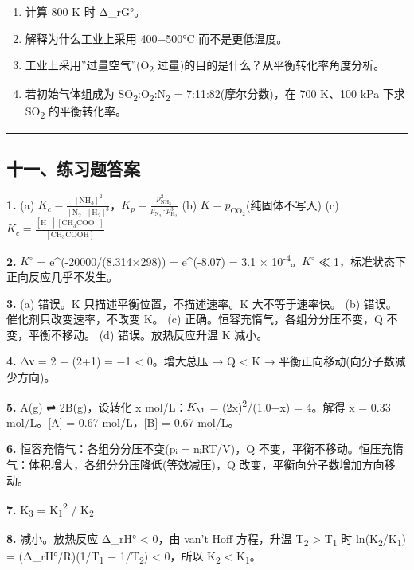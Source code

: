 \begin{enumerate}
\def\labelenumi{(\alph{enumi})}
\tightlist
\item
  计算 800 K 时 Δ\_rG°。
\item
  解释为什么工业上采用 400−500°C 而不是更低温度。
\item
  工业上采用''过量空气''(O\textsubscript{2} 过量)的目的是什么？从平衡转化率角度分析。
\item
  若初始气体组成为 SO\textsubscript{2}:O\textsubscript{2}:N\textsubscript{2} = 7:11:82(摩尔分数)，在 700 K、100 kPa 下求 SO\textsubscript{2} 的平衡转化率。
\end{enumerate}

\begin{center}\rule{0.5\linewidth}{0.5pt}\end{center}

\subsection{十一、练习题答案}\label{ux5341ux4e00ux7ec3ux4e60ux9898ux7b54ux6848}

\textbf{1.}
(a) \(K_c = \frac{[\mathrm{NH_3}]^2}{[\mathrm{N_2}][\mathrm{H_2}]^3}\)，\(K_p = \frac{p_{\mathrm{NH_3}}^2}{p_{\mathrm{N_2}} \cdot p_{\mathrm{H_2}}^3}\)
(b) \(K = p_{\mathrm{CO_2}}\)(纯固体不写入)
(c) \(K_c = \frac{[\mathrm{H^+}][\mathrm{CH_3COO^-}]}{[\mathrm{CH_3COOH}]}\)

\textbf{2.} \(K^{\circ}\) = e\^{}(-20000/(8.314×298)) = e\^{}(-8.07) = 3.1 × 10\textsuperscript{-4}。\(K^{\circ}\) ≪ 1，标准状态下正向反应几乎不发生。

\textbf{3.}
(a) 错误。K 只描述平衡位置，不描述速率。K 大不等于速率快。
(b) 错误。催化剂只改变速率，不改变 K。
(c) 正确。恒容充惰气，各组分分压不变，Q 不变，平衡不移动。
(d) 错误。放热反应升温 K 减小。

\textbf{4.} Δν = 2 − (2+1) = −1 \textless{} 0。增大总压 → Q \textless{} K → 平衡正向移动(向分子数减少方向)。

\textbf{5.} A(g) ⇌ 2B(g)，设转化 x mol/L：\(K_{\1}\) = (2x)\textsuperscript{2}/(1.0−x) = 4。解得 x = 0.33 mol/L。{[}A{]} = 0.67 mol/L，{[}B{]} = 0.67 mol/L。

\textbf{6.} 恒容充惰气：各组分分压不变(pᵢ = nᵢRT/V)，Q 不变，平衡不移动。恒压充惰气：体积增大，各组分分压降低(等效减压)，Q 改变，平衡向分子数增加方向移动。

\textbf{7.} K\textsubscript{3} = K\textsubscript{1}\textsuperscript{2} / K\textsubscript{2}

\textbf{8.} 减小。放热反应 Δ\_rH° \textless{} 0，由 van't Hoff 方程，升温 T\textsubscript{2} \textgreater{} T\textsubscript{1} 时 ln(K\textsubscript{2}/K\textsubscript{1}) = (Δ\_rH°/R)(1/T\textsubscript{1} − 1/T\textsubscript{2}) \textless{} 0，所以 K\textsubscript{2} \textless{} K\textsubscript{1}。

